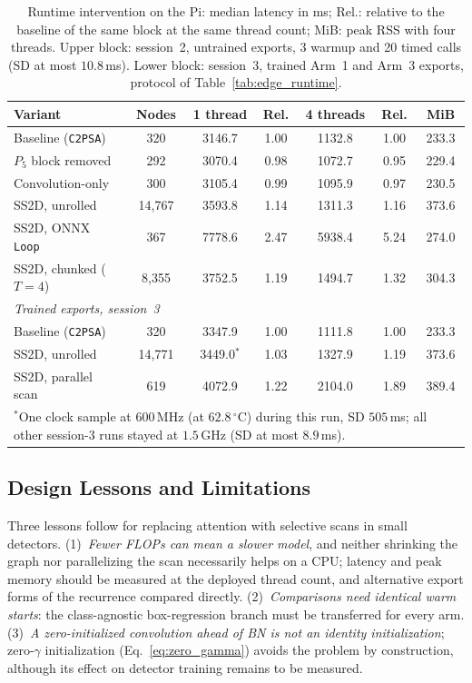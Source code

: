 \begin{table}[!t]
\caption{Runtime intervention on the Pi: median latency in ms; Rel.: relative to the baseline of the same block at the same thread count; MiB: peak RSS with four threads. Upper block: session~2, untrained exports, 3 warmup and 20 timed calls (SD at most $10.8$\,ms). Lower block: session~3, trained Arm~1 and Arm~3 exports, protocol of Table~\ref{tab:edge_runtime}.}
\label{tab:g1_intervention}
\centering
\footnotesize
\setlength{\tabcolsep}{5pt}
\begin{tabular}{lcccccc}
\toprule
\textbf{Variant} & \textbf{Nodes} & \textbf{1 thread} & \textbf{Rel.} & \textbf{4 threads} & \textbf{Rel.} & \textbf{MiB} \\
\midrule
Baseline (\texttt{C2PSA}) & 320 & 3146.7 & 1.00 & 1132.8 & 1.00 & 233.3 \\
$P_5$ block removed & 292 & 3070.4 & 0.98 & 1072.7 & 0.95 & 229.4 \\
Convolution-only & 300 & 3105.4 & 0.99 & 1095.9 & 0.97 & 230.5 \\
SS2D, unrolled & 14{,}767 & 3593.8 & 1.14 & 1311.3 & 1.16 & 373.6 \\
SS2D, ONNX \texttt{Loop} & 367 & 7778.6 & 2.47 & 5938.4 & 5.24 & 274.0 \\
SS2D, chunked ($T = 4$) & 8{,}355 & 3752.5 & 1.19 & 1494.7 & 1.32 & 304.3 \\
\midrule
\multicolumn{7}{l}{\textit{Trained exports, session~3}} \\
Baseline (\texttt{C2PSA}) & 320 & 3347.9 & 1.00 & 1111.8 & 1.00 & 233.3 \\
SS2D, unrolled & 14{,}771 & 3449.0$^{*}$ & 1.03 & 1327.9 & 1.19 & 373.6 \\
SS2D, parallel scan & 619 & 4072.9 & 1.22 & 2104.0 & 1.89 & 389.4 \\
\bottomrule
\multicolumn{7}{p{0.92\textwidth}}{\scriptsize $^{*}$One clock sample at $600$\,MHz (at $62.8\,^{\circ}$C) during this run, SD $505$\,ms; all other session-3 runs stayed at $1.5$\,GHz (SD at most $8.9$\,ms).} \\
\end{tabular}
\end{table}

\subsection{Design Lessons and Limitations}
\label{sec:limitations}
Three lessons follow for replacing attention with selective scans in small detectors. (1)~\emph{Fewer FLOPs can mean a slower model}, and neither shrinking the graph nor parallelizing the scan necessarily helps on a CPU; latency and peak memory should be measured at the deployed thread count, and alternative export forms of the recurrence compared directly. (2)~\emph{Comparisons need identical warm starts}: the class-agnostic box-regression branch must be transferred for every arm. (3)~\emph{A zero-initialized convolution ahead of BN is not an identity initialization}; zero-$\gamma$ initialization (Eq.~\eqref{eq:zero_gamma}) avoids the problem by construction, although its effect on detector training remains to be measured.

